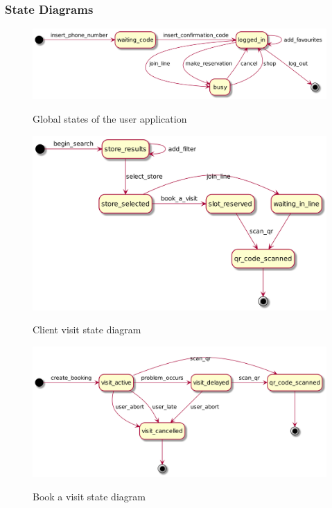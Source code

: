 \subsubsection{State Diagrams}
\begin{figure}[H]
    \centering
    \includegraphics[width=1\textwidth]{uml/app_state.png}
    \label{fig:app_state_diag}
    \caption{Global states of the user application}
\end{figure}

\begin{figure}[H]
    \centering
    \includegraphics[width=1\textwidth]{uml/client_state_chart.png}
    \label{fig:client_state_diag}
    \caption{Client visit state diagram}
\end{figure}

\begin{figure}[H]
    \centering
    \includegraphics[width=1\textwidth]{uml/visit_state_diagram.png}
    \label{fig:visit_state_diag}
    \caption{Book a visit state diagram}
\end{figure}


